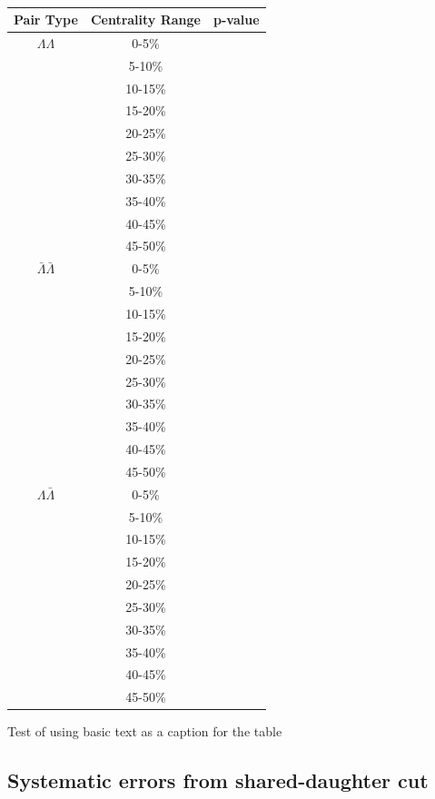 \begin{table}
\caption {} \label{tab:}
\begin{center}
\begin{tabular}{| c | c | c |}
  \hline                       
  Pair Type & Centrality Range & p-value \\
  \hline
  $\Lambda\Lambda$ & 0-5\% &   \\
   & 5-10\%  &  \\
   & 10-15\% &  \\
   & 15-20\% &  \\
   & 20-25\% &  \\
   & 25-30\% &  \\
   & 30-35\% &  \\
   & 35-40\% &  \\
   & 40-45\% &  \\
   & 45-50\% &  \\
   \hline
  $\bar{\Lambda}\bar{\Lambda}$ &  0-5\% &  \\
   & 5-10\% &  \\
   & 10-15\% &  \\
   & 15-20\% &  \\
   & 20-25\% &  \\
   & 25-30\% &  \\
   & 30-35\% &  \\
   & 35-40\% &  \\
   & 40-45\% &  \\
   & 45-50\% &  \\
   \hline
  $\Lambda\bar{\Lambda}$ &  0-5\% &  \\
   & 5-10\% &  \\
   & 10-15\% &  \\
   & 15-20\% &  \\
   & 20-25\% &  \\
   & 25-30\% &  \\
   & 30-35\% &  \\
   & 35-40\% &  \\
   & 40-45\% &  \\
   & 45-50\% &  \\
  \hline  
\end{tabular}
Test of using basic text as a caption for the table
\end{center}
\end{table}

\subsection{Systematic errors from shared-daughter cut}

